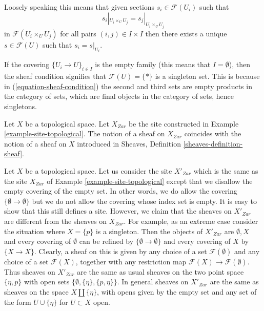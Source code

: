 \noindent
Loosely speaking this means that given sections $s_i \in \mathcal{F}(U_i)$
such that
$$
s_i|_{U_i \times_U U_j} = s_j|_{U_i \times_U U_j}
$$
in $\mathcal{F}(U_i \times_U U_j)$ for all pairs $(i, j) \in I \times I$
then there exists a unique $s \in \mathcal{F}(U)$ such
that $s_i = s|_{U_i}$.

\begin{remark}
\label{remark-sheaf-condition-empty-covering}
If the covering $\{U_i \to U\}_{i \in I}$ is the empty family (this means
that $I = \emptyset$), then the sheaf condition signifies that
$\mathcal{F}(U) = \{*\}$ is a singleton set. This is because
in (\ref{equation-sheaf-condition}) the second and third sets
are empty products in the category of sets, which are final objects
in the category of sets, hence singletons.
\end{remark}

\begin{example}
\label{example-sheaves-topological}
Let $X$ be a topological space. Let $X_{Zar}$ be the
site constructed in Example \ref{example-site-topological}.
The notion of a sheaf on $X_{Zar}$ coincides
with the notion of a sheaf on $X$ introduced in
Sheaves, Definition \ref{sheaves-definition-sheaf}.
\end{example}

\begin{example}
\label{example-topological-wrong}
Let $X$ be a topological space. Let us consider the site $X'_{Zar}$ which is
the same as the site $X_{Zar}$ of
Example \ref{example-site-topological} except that
we disallow the empty covering of the empty set.
In other words, we do allow the covering $\{\emptyset \to \emptyset\}$
but we do not allow the covering whose index set is empty.
It is easy to show that this still defines a site. However,
we claim that the sheaves on $X'_{Zar}$ are different
from the sheaves on $X_{Zar}$. For example, as an extreme
case consider the situation where $X = \{p\}$ is a singleton.
Then the objects of $X'_{Zar}$ are $\emptyset, X$
and every covering of $\emptyset$ can be refined by
$\{\emptyset \to \emptyset\}$ and every covering of $X$ by $\{X \to X\}$.
Clearly, a sheaf on this is given by any choice of
a set $\mathcal{F}(\emptyset)$ and any choice of a
set $\mathcal{F}(X)$, together with any restriction map
$\mathcal{F}(X) \to \mathcal{F}(\emptyset)$. Thus sheaves
on $X'_{Zar}$ are the same as usual sheaves on the two point space
$\{\eta, p\}$ with open sets $\{\emptyset, \{\eta\}, \{p, \eta\}\}$.
In general sheaves on $X'_{Zar}$ are the same as sheaves
on the space $X \amalg \{\eta\}$, with opens given by
the empty set and any set of the form $U \cup \{\eta\}$ for
$U \subset X$ open.
\end{example}


